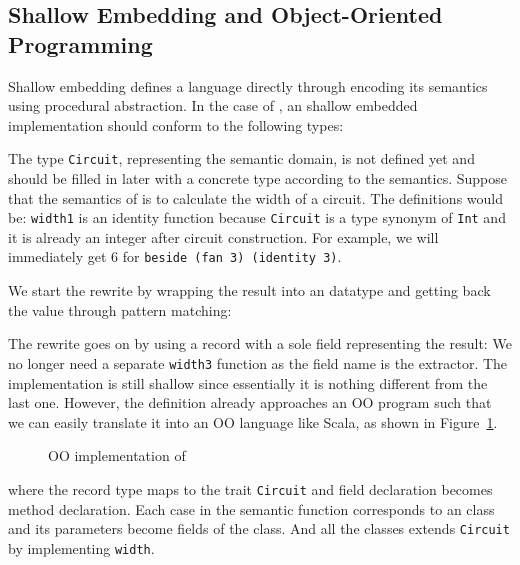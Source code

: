 \subsection{Shallow Embedding and Object-Oriented Programming}
Shallow embedding defines a language directly through encoding its semantics
using procedural abstraction. In the case of \dsl,
an shallow embedded implementation should conform to the following types:

The type \texttt{Circuit}, representing the semantic domain, is not defined yet
and should be filled in later with a concrete type according to the semantics.
Suppose that the semantics of \dsl is to calculate the width of a
circuit. The definitions would be:
\texttt{width1} is an identity function because \texttt{Circuit} is a type
synonym of \lstinline{Int} and it is already an integer after circuit construction.
For example, we will immediately get $6$ for \texttt{beside (fan 3) (identity 3)}.

We start the rewrite by wrapping the result into an
datatype and getting back the value through pattern matching:

The rewrite goes on by using a record with a sole field representing the result:
We no longer need a separate \texttt{width3} function as the field name is the extractor.
The implementation is still shallow since essentially it is nothing different
from the last one.
However, the definition already approaches an OO program such that we can easily
translate it into an OO language like Scala, as shown in Figure~\ref{code:base}.

\begin{figure}
\caption{OO implementation of \dsl}
\label{code:base}
\end{figure}
where the record type maps to the trait \texttt{Circuit} and field
declaration becomes method declaration.
Each case in the semantic function corresponds to an class and its parameters become fields of the class.
And all the classes extends \texttt{Circuit} by implementing \texttt{width}.

